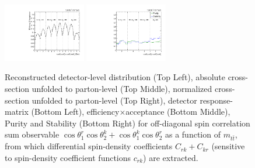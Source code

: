 \begin{figure}[htb]
\begin{center}
 \includegraphics[width=0.32\textwidth]{fig_fullRun2UL/unfolding/combined/TotEff_c_Prk_mttbar.pdf}
 \includegraphics[width=0.32\textwidth]{fig_fullRun2UL/unfolding/combined/PurStab_c_Prk_mttbar.pdf} \\
\caption{Reconstructed detector-level distribution (Top Left), absolute cross-section unfolded to parton-level (Top Middle), normalized cross-section unfolded to parton-level (Top Right), detector response-matrix (Bottom Left), efficiency$\times$acceptance (Bottom Middle), Purity and Stability (Bottom Right) for off-diagonal spin correlation sum observable $\cos\theta_{1}^{r}\cos\theta_{2}^{k}+\cos\theta_{1}^{k}\cos\theta_{2}^{r}$ as a function of $m_{t\bar{t}}$, from which differential spin-density coefficients $C_{rk}+C_{kr}$ (sensitive to spin-density coefficient functions $c_{r k}$) are extracted.}
\label{fig:c_Prk_mttbar}
\end{center}
\end{figure}
\clearpage
